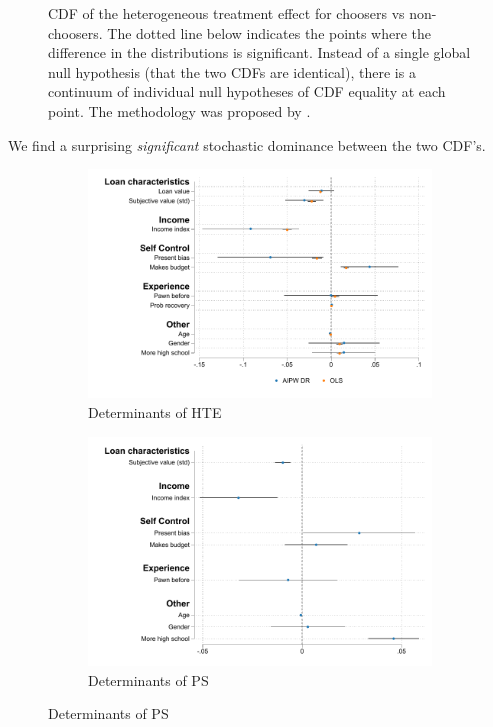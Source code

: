 \documentclass[oneside,11pt]{article}
\begin{document}
\begin{figure}[H]
\begin{center}
    \end{center}
     \scriptsize    CDF of the heterogeneous treatment effect for choosers vs non-choosers. The dotted line below indicates the points where the difference in the distributions is significant.  Instead of a single global null hypothesis (that the two CDFs are identical), there is a continuum of individual null hypotheses of CDF equality at each point. The methodology was proposed by \cite{GOLDMAN2018143}.

 

\end{figure}

We find a surprising \emph{significant} stochastic dominance between the two CDF's.

\begin{figure}[H]
    \caption{}
    \label{}
    \begin{center}
    \begin{subfigure}{0.475\textwidth}
        \caption{Determinants of HTE}
        \centering
        \includegraphics[width=\textwidth]{Figuras/HE/he_int_vertical_eff_cost_loan_pro_2.pdf}
    \end{subfigure}
    \begin{subfigure}{0.475\textwidth}
        \caption{Determinants of PS}
        \centering
        \includegraphics[width=\textwidth]{Figuras/HE/ps_int_vertical_pr_gbc_1.pdf}
    \end{subfigure}
  

\end{center}
\end{figure}
\end{document}
